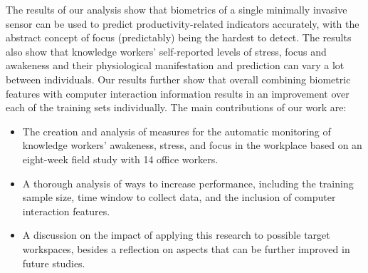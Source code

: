 The results of our analysis show that biometrics of a single minimally invasive sensor can be used to predict productivity-related indicators accurately, with the abstract concept of focus (predictably) being the hardest to detect. The results also show that knowledge workers' self-reported levels of stress, focus and awakeness and their physiological manifestation and prediction can vary a lot between individuals. Our results further show that overall combining biometric features with computer interaction information 
results in an improvement
over each of the training sets individually.
The main contributions of our work are:
\begin{itemize}
	\item The creation and analysis of measures for the automatic monitoring of knowledge workers' awakeness, stress, and focus in the workplace based on an eight-week field study with 14 office workers.
	\item A thorough analysis of ways to increase performance, including the training sample size, time window to collect data, and the inclusion of computer interaction features.
	\item A discussion on the impact of applying this research to possible target workspaces, besides a reflection on aspects that can be further improved in future studies.
    \end{itemize}

